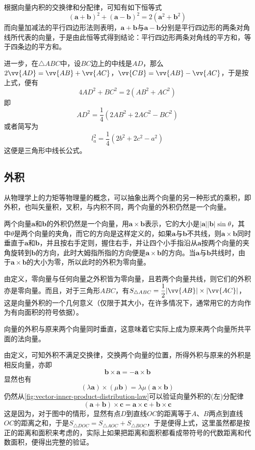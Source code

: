\begin{example}
  根据向量内积的交换律和分配律，可知有如下恒等式
  \[ (\bm{a}+\bm{b})^2 + (\bm{a}-\bm{b})^2 = 2(\bm{a}^2+\bm{b}^2) \]
而向量加减法的平行四边形法则表明，$\bm{a+b}$与$\bm{a-b}$分别是平行四边形的两条对角线所代表的向量，于是由此恒等式得到结论：平行四边形两条对角线的平方和，等于四条边的平方和。

进一步，在$\triangle ABC$中，设$BC$边上的中线是$AD$，那么$2\vv{AD}=\vv{AB}+\vv{AC}$，$\vv{CB}=\vv{AB}-\vv{AC}$，于是按上式，便有
\[ 4AD^2+BC^2=2(AB^2+AC^2) \]
即
\[ AD^2 = \frac{1}{4}(2AB^2+2AC^2-BC^2) \]
或者简写为
\[ l_a^2 = \frac{1}{4}(2b^2+2c^2-a^2) \]
这便是三角形中线长公式。
\end{example}


\subsection{外积}
\label{sec:outer-product-of-vectors}

从物理学上的力矩等物理量的概念，可以抽象出两个向量的另一种形式的乘积，即外积，也叫矢量积，叉积，与内积不同，两个向量的外积仍然是一个向量。

\begin{definition}
  两个向量$\bm{a}$和$\bm{b}$的外积仍然是一个向量，用$\bm{a}\times\bm{b}$表示，它的大小是$|\bm{a}||\bm{b}|\sin{\theta}$，其中$\theta$是两个向量的夹角，而它的方向是这样定义的，如果$\bm{a}$与$\bm{b}$不共线，则$\bm{a}\times\bm{b}$同时垂直于$\bm{a}$和$\bm{b}$，并且按右手定则，握住右手，并让四个小手指沿从$\bm{a}$按两个向量的夹角旋转到$\bm{b}$的方向，此时大姆指所指的方向便是$\bm{a}\times\bm{b}$的方向。当$\bm{a}$与$\bm{b}$共线时，由于$\bm{a}\times\bm{b}$的大小为零，所以此时的外积为零向量。
\end{definition}

由定义，零向量与任何向量之外积皆为零向量，且若两个向量共线，则它们的外积亦是零向量。而且，对于三角形$ABC$，有$S_{\triangle ABC} = \dfrac{1}{2}|\vv{AB}|\times|\vv{AC}|$，这是向量外积的一个几何意义（仅限于其大小，在许多情况下，通常用它的方向作为有向面积的符号依据）。

向量的外积与原来两个向量同时垂直，这意味着它实际上成为原来两个向量所共平面的法向量。

由定义，可知外积不满足交换律，交换两个向量的位置，所得外积与原来的外积是相反向量，亦即
\[ \bm{b} \times \bm{a} = - \bm{a} \times \bm{b} \]
显然也有
\[ (\lambda \bm{a}) \times (\mu \bm{b}) = \lambda \mu (\bm{a}\times\bm{b}) \]
仍然从\autoref{fig:vector-inner-product-distribution-law}可以验证向量外积的(左)分配律
\[ (\bm{a}+\bm{b}) \times \bm{c} = \bm{a} \times \bm{c} + \bm{b} \times \bm{c} \]
这是因为，对于图中的情形，显然有点$D$到直线$OC$的距离等于$A$、$B$两点到直线$OC$的距离之和，于是$S_{\triangle DOC} = S_{\triangle AOC} + S_{\triangle BOC}$，于是便得上式，这里虽然都是按正的距离和面积来考虑的，实际上如果把距离和面积都看成带符号的代数距离和代数面积，便得出完整的验证。

